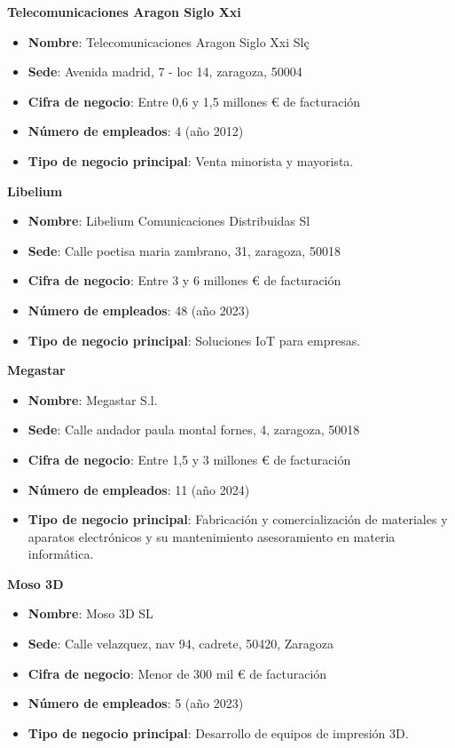 \documentclass[11.5pt]{article}
\begin{document}
	\noindent\textbf{{\large Telecomunicaciones Aragon Siglo Xxi}}
	
	\begin{itemize}
		\item \textbf{Nombre}: Telecomunicaciones Aragon Siglo Xxi Slç
		\item 	\textbf{Sede}: Avenida madrid, 7 - loc 14, zaragoza, 50004
		\item 	\textbf{Cifra de negocio}: Entre 0,6 y 1,5 millones € de facturación
		\item 	\textbf{Número de empleados}: 4 (año 2012)	
		\item 	\textbf{Tipo de negocio principal}: Venta minorista y mayorista.
	\end{itemize}
	
	\noindent\textbf{{\large Libelium}}
	
	\begin{itemize}
		\item \textbf{Nombre}: Libelium Comunicaciones Distribuidas Sl
		\item 	\textbf{Sede}: Calle poetisa maria zambrano, 31, zaragoza, 50018	
		\item 	\textbf{Cifra de negocio}: Entre 3 y 6 millones € de facturación
		\item 	\textbf{Número de empleados}: 48 (año 2023)
		\item 	\textbf{Tipo de negocio principal}: Soluciones IoT para empresas.
	\end{itemize}
	
	\noindent\textbf{{\large Megastar}}
	
	\begin{itemize}
		\item \textbf{Nombre}: Megastar S.l.
		\item 	\textbf{Sede}: Calle andador paula montal fornes, 4, zaragoza, 50018
		\item 	\textbf{Cifra de negocio}: Entre 1,5 y 3 millones € de facturación
		\item 	\textbf{Número de empleados}: 11 (año 2024)	
		\item 	\textbf{Tipo de negocio principal}: Fabricación y comercialización de materiales y aparatos electrónicos y su mantenimiento asesoramiento en materia informática.
	\end{itemize}
	
	\noindent\textbf{{\large Moso 3D}}
	
	\begin{itemize}
		\item \textbf{Nombre}: Moso 3D SL
		\item 	\textbf{Sede}: Calle velazquez, nav 94, cadrete, 50420, Zaragoza
		\item 	\textbf{Cifra de negocio}: Menor de 300 mil € de facturación
		\item 	\textbf{Número de empleados}: 5 (año 2023)
		\item 	\textbf{Tipo de negocio principal}: Desarrollo de equipos de impresión 3D.
	\end{itemize}
	
\end{document}
